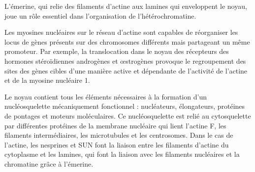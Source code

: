 L'émerine, qui relie des filaments d'actine aux lamines qui enveloppent le noyau, joue un rôle essentiel dans l'organisation de l'hétérochromatine. 

Les myosines nucléaires sur le réseau d'actine sont capables de réorganiser les locus de gènes présents sur des chromosomes différents mais partageant un même promoteur. Par exemple, la translocation dans le noyau des récepteurs des hormones stéroïdiennes androgènes et \oe strogènes provoque le regroupement des sites des gènes cibles d'une manière active et dépendante de l'activité de l'actine et de la myosine nucléaire 1. 

Le noyau contient tous les éléments nécessaires à la formation d'un nucléosquelette mécaniquement fonctionnel : nucléateurs, élongateurs, protéines de pontages et moteurs moléculaires. 
Ce nucléosquelette est relié au cytosquelette par différentes protéines de la membrane nucléaire qui lient l'actine F, les filaments intermédiaires, les microtubules et les centrosomes. 
Dans le cas de l'actine, les nesprines et SUN font la liaison entre les filaments d'actine du cytoplasme et les lamines, qui font la liaison avec les filaments nucléaires et la chromatine grâce à l'émerine. 





%